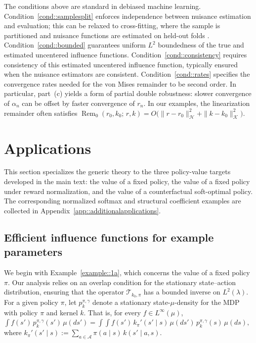 \documentclass[12pt]{article}
\theoremstyle{plain}
\begin{document}
\noindent The conditions above are standard in debiased machine learning.  
Condition~\ref{cond::samplesplit} enforces independence between nuisance estimation and evaluation; this can be relaxed to cross-fitting, where the sample is partitioned and nuisance functions are estimated on held-out folds \citep{van2011targeted, chernozhukov2018double}.  
Condition~\ref{cond::bounded} guarantees uniform $L^2$ boundedness of the true and estimated uncentered influence functions.  
Condition~\ref{cond::consistency} requires consistency of this estimated uncentered influence function, typically ensured when the nuisance estimators are consistent.  
Condition~\ref{cond::rates} specifies the convergence rates needed for the von Mises remainder to be second order.  
In particular, part~(c) yields a form of partial double robustness: slower convergence of $\alpha_n$ can be offset by faster convergence of $r_n$.  
In our examples, the linearization remainder often satisfies $\operatorname{Rem}_0(r_0,k_0;\, r,k) = O\big(\|r - r_0\|_{\mathcal H}^2 + \|k - k_0\|_{\mathcal K}^2\big)$.


 

\section{Applications}
\label{sec::applications}

This section specializes the generic theory to the three policy-value targets
developed in the main text: the value of a fixed policy, the value of a fixed
policy under reward normalization, and the value of a counterfactual
soft-optimal policy. The corresponding normalized softmax and structural coefficient
examples are collected in Appendix~\ref{app::additionalapplications}.

\subsection{Efficient influence functions for example parameters}
\label{section::EIFexamples}

  We begin with Example~\ref{example::1a}, which concerns the value of a fixed
policy \(\pi\). Our analysis relies on an overlap condition for the stationary
state--action distribution, ensuring that the operator
\(\mathcal{T}_{k_0,\pi}\) has a bounded inverse on \(L^2(\lambda)\). For a
given policy \(\pi\), let \(p_{k}^{\pi,\gamma}\) denote a stationary
state-\(\mu\)-density for the MDP with policy \(\pi\) and kernel \(k\). That
is, for every \(f \in L^\infty(\mu)\), $\int f(s')\, p_{k}^{\pi,\gamma}(s')\, \mu(ds')
=
\int\!\!\int f(s')\, k_\pi'(s' \mid s)\, \mu(ds')\,
p_{k}^{\pi,\gamma}(s)\,\mu(ds),$ where
\(k_{\pi}'(s' \mid s):=\sum_{a \in \mathcal{A}} \pi(a \mid s)\, k(s' \mid a,s)\).
\end{document}
